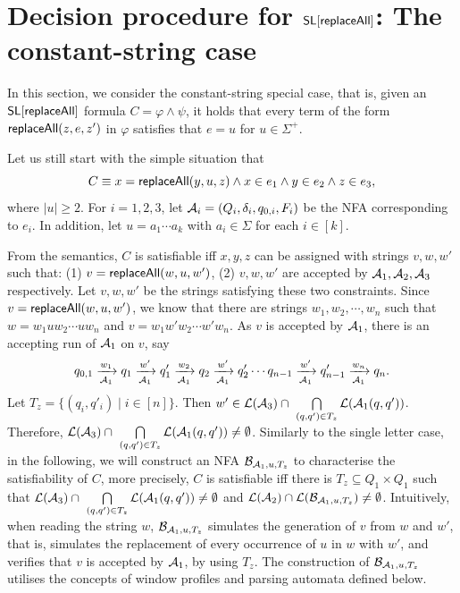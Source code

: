 
\section{Decision procedure for $\mathsf{SL}[\mathsf{replaceAll}]$: The constant-string case}

In this section, we consider the constant-string special case, that is, given an $\mathsf{SL}[\mathsf{replaceAll}]$ formula $C = \varphi \wedge \psi$, it holds that every term of the form $\mathsf{replaceAll}(z, e, z')$ in $\varphi$ satisfies that $e=u$ for $u \in \Sigma^+$.

Let us still start with the simple situation that 
$$C \equiv x = \mathsf{replaceAll}(y, u, z) \wedge x \in e_1 \wedge y \in e_2 \wedge z \in e_3,$$
where $|u| \ge 2$. For $i=1,2,3$, let $\mathcal{A}_i = (Q_i, \delta_i, q_{0, i}, F_i)$ 
be the NFA corresponding to $e_i$. In addition, let $u = a_1 \cdots a_k$ with $a_i \in \Sigma$ for each $i \in [k]$.

From the semantics, $C$ is satisfiable iff $x, y, z$ can be assigned with  strings $v, w, w'$ such that: (1) $v = \mathsf{replaceAll}(w, u, w')$, (2) $v,w, w'$ are accepted by $\mathcal{A}_1, \mathcal{A}_2, \mathcal{A}_3$ respectively. Let $v, w, w'$ be the strings satisfying these two constraints. Since $v = \mathsf{replaceAll}(w, u, w')$, we know that there are strings $w_1, w_2, \cdots, w_n$ such that $w= w_1 u w_2 \cdots u w_n$ and $v = w_1 w' w_2 \cdots w' w_n$. As $v$ is accepted by $\mathcal{A}_1$, there is an accepting run of $\mathcal{A}_1$ on $v$, say 
$$
q_{0,1} \xrightarrow[\mathcal{A}_1]{w_1} q_1 \xrightarrow[\mathcal{A}_1]{w'} q'_1 \xrightarrow[\mathcal{A}_1]{w_2} q_2 \xrightarrow[\mathcal{A}_1]{w'} q'_2 \cdots q_{n-1} \xrightarrow[\mathcal{A}_1]{w'} q'_{n-1} \xrightarrow[\mathcal{A}_1]{w_n} q_n.
$$
Let $T_z = \{(q_i, q'_i) \mid i \in [n]\}$. Then $w' \in \mathcal{L}(\mathcal{A}_3) \cap\ \bigcap \limits_{(q,q') \in T_z} \mathcal{L}(\mathcal{A}_1(q, q'))$. Therefore, $\mathcal{L}(\mathcal{A}_3) \cap\ \bigcap \limits_{(q,q') \in T_z} \mathcal{L}(\mathcal{A}_1(q, q')) \neq \emptyset$. Similarly to the single letter case, in the following, we will construct an NFA $\mathcal{B}_{\mathcal{A}_1, u, T_z}$ to characterise the satisfiability of $C$, more precisely, $C$ is satisfiable iff there is $T_z \subseteq Q_1 \times Q_1$ such that $\mathcal{L}(\mathcal{A}_3) \cap\ \bigcap \limits_{(q,q') \in T_z} \mathcal{L}(\mathcal{A}_1(q, q')) \neq \emptyset$ and 
$\mathcal{L}(\mathcal{A}_2) \cap \mathcal{L}(\mathcal{B}_{\mathcal{A}_1, u, T_z}) \neq \emptyset$. Intuitively, when reading the string $w$, $\mathcal{B}_{\mathcal{A}_1, u, T_z}$ simulates the generation of $v$ from $w$ and $w'$, that is, simulates the replacement of  every occurrence of $u$ in $w$ with $w'$, and verifies that $v$ is accepted by $\mathcal{A}_1$, by using $T_z$.
The construction of $\mathcal{B}_{\mathcal{A}_1, u, T_z}$ utilises the concepts of window profiles and parsing automata defined below.
%


